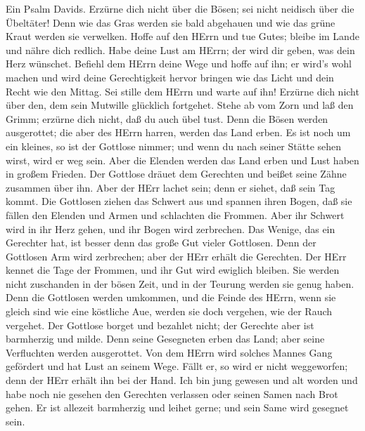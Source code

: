  Ein Psalm Davids. Erzürne dich nicht über die Bösen; sei
nicht neidisch über die Übeltäter!  Denn wie das Gras werden
sie bald abgehauen und wie das grüne Kraut werden sie verwelken.
 Hoffe auf den HErrn und tue Gutes; bleibe im Lande und
nähre dich redlich.  Habe deine Lust am HErrn; der wird dir
geben, was dein Herz wünschet.  Befiehl dem HErrn deine Wege
und hoffe auf ihn; er wird's wohl machen  und wird deine
Gerechtigkeit hervor bringen wie das Licht und dein Recht wie den
Mittag.  Sei stille dem HErrn und warte auf ihn! Erzürne
dich nicht über den, dem sein Mutwille glücklich fortgehet. 
Stehe ab vom Zorn und laß den Grimm; erzürne dich nicht, daß du auch
übel tust.  Denn die Bösen werden ausgerottet; die aber des
HErrn harren, werden das Land erben.  Es ist noch um ein
kleines, so ist der Gottlose nimmer; und wenn du nach seiner Stätte
sehen wirst, wird er weg sein.  Aber die Elenden werden das
Land erben und Lust haben in großem Frieden.  Der Gottlose
dräuet dem Gerechten und beißet seine Zähne zusammen über ihn.
 Aber der HErr lachet sein; denn er siehet, daß sein Tag
kommt.  Die Gottlosen ziehen das Schwert aus und spannen
ihren Bogen, daß sie fällen den Elenden und Armen und schlachten die
Frommen.  Aber ihr Schwert wird in ihr Herz gehen, und ihr
Bogen wird zerbrechen.  Das Wenige, das ein Gerechter hat,
ist besser denn das große Gut vieler Gottlosen.  Denn der
Gottlosen Arm wird zerbrechen; aber der HErr erhält die Gerechten.
 Der HErr kennet die Tage der Frommen, und ihr Gut wird
ewiglich bleiben.  Sie werden nicht zuschanden in der bösen
Zeit, und in der Teurung werden sie genug haben.  Denn die
Gottlosen werden umkommen, und die Feinde des HErrn, wenn sie gleich
sind wie eine köstliche Aue, werden sie doch vergehen, wie der Rauch
vergehet.  Der Gottlose borget und bezahlet nicht; der
Gerechte aber ist barmherzig und milde.  Denn seine
Gesegneten erben das Land; aber seine Verfluchten werden ausgerottet.
 Von dem HErrn wird solches Mannes Gang gefördert und hat
Lust an seinem Wege.  Fällt er, so wird er nicht
weggeworfen; denn der HErr erhält ihn bei der Hand.  Ich
bin jung gewesen und alt worden und habe noch nie gesehen den Gerechten
verlassen oder seinen Samen nach Brot gehen.  Er ist
allezeit barmherzig und leihet gerne; und sein Same wird gesegnet sein.
